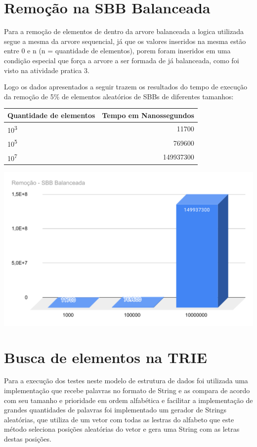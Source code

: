 \section{Remoção na SBB Balanceada}
Para a remoção de elementos de dentro da arvore balanceada a logica utilizada segue a mesma da arvore sequencial, já que os valores inseridos na mesma estão entre 0 e n (n = quantidade de elementos), porem foram inseridos em uma condição especial que força a arvore a ser formada de já balanceada, como foi visto na atividade pratica 3.

Logo os dados apresentados a seguir trazem os resultados do tempo de execução da remoção de 5\% de elementos aleatórios de SBBs de diferentes tamanhos:

    \begin{center}
        \begin{tabular}{| l | r |}
            \hline
            Quantidade de elementos & Tempo em Nanossegundos\\
            \hline
            10\textsuperscript{3} & 11700\\
            10\textsuperscript{5} & 769600\\
            10\textsuperscript{7} & 149937300\\
            \hline
        \end{tabular}
    \end{center}
    
    \begin{center}
            \includegraphics[scale=0.8]{Trabalho AED/fig/chart (2).pdf}
            \label{fig:Grafico 3}
    \end{center}
    
\section{Busca de elementos na TRIE}
Para a execução dos testes neste modelo de estrutura de dados foi utilizada uma implementação\cite{Samuellucas97} que recebe palavras no formato de String e as compara de acordo com seu tamanho e prioridade em ordem alfabética e facilitar a implementação de grandes quantidades de palavras foi implementado um gerador de Strings aleatórias, que utiliza de um vetor com todas as lestras do alfabeto que este método seleciona posições aleatórias do vetor e gera uma String com as letras destas posições\cite{gerarString}.

